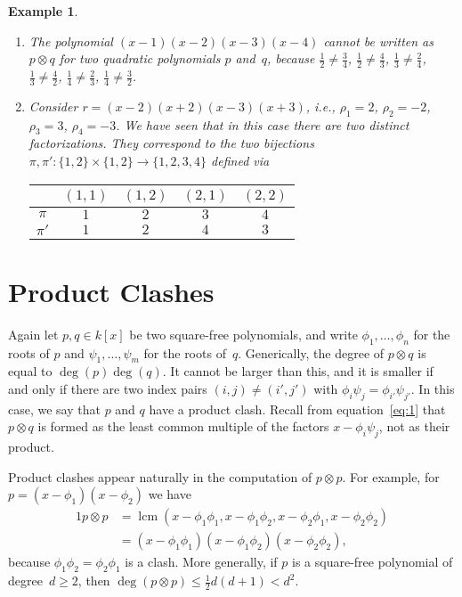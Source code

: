 \documentclass{sig-alternate}
\newtheorem{example}[theorem]{Example}
\def\lcm{\operatorname{lcm}}
\begin{document}
\begin{example}
\begin{enumerate}
    In this example, no other factorizations exist except for those that are
    obtained by replacing $p$ and $q$ by $p\otimes(x-\xi)$ and
    $(x-\xi^{-1})\otimes q$ for some $\xi\neq0$. This degree of freedom is
    reflected by the arbitrary choice of~$\phi_1$.    
  \item The polynomial $(x-1)(x-2)(x-3)(x-4)$ cannot be written as
    $p\otimes q$ for two quadratic polynomials $p$ and~$q$, because
    $\frac12\neq\frac34$,
    $\frac12\neq\frac43$,
    $\frac13\neq\frac24$,
    $\frac13\neq\frac42$,
    $\frac14\neq\frac23$,
    $\frac14\neq\frac32$.
  \item Consider $r=(x-2)(x+2)(x-3)(x+3)$, i.e., $\rho_1=2$, $\rho_2=-2$, $\rho_3=3$, $\rho_4=-3$.
    We have seen that in this case there are two distinct factorizations.
    They correspond to the two bijections
    $\pi,\pi'\colon\{1,2\}\times\{1,2\}\to\{1,2,3,4\}$ defined via
    \begin{center}
      \begin{tabular}{c|cccc}
               & $(1,1)$ & $(1,2)$ & $(2,1)$ & $(2,2)$ \\\hline
        $\pi$  &  $1$    &  $2$     &  $3$   & $4$ \\
        $\pi'$ &  $1$    &  $2$     &  $4$   & $3$
      \end{tabular}
    \end{center}
  \end{enumerate}
\end{example}

\section{Product Clashes}

Again let $p,q\in k[x]$ be two square-free polynomials, and write
$\phi_1,\dots,\phi_n$ for the roots of $p$ and $\psi_1,\dots,\psi_m$ for the
roots of~$q$. Generically, the degree of $p\otimes q$ is equal to
$\deg(p)\deg(q)$. It cannot be larger than this, and it is smaller if and only
if there are two index pairs $(i,j)\neq(i',j')$ with
$\phi_i\psi_j=\phi_{i'}\psi_{j'}$. In this case, we say that $p$ and $q$ have a
product clash. Recall from equation~\eqref{eq:1} that $p\otimes q$ is formed as
the least common multiple of the factors $x-\phi_i\psi_j$, not as their product.

Product clashes appear naturally in the computation of $p\otimes p$.
For example, for $p=(x-\phi_1)(x-\phi_2)$ we have
\begin{alignat*}1
  p\otimes p
  &=\lcm(x-\phi_1\phi_1,x-\phi_1\phi_2,x-\phi_2\phi_1,x-\phi_2\phi_2)\\
  &=(x-\phi_1\phi_1)(x-\phi_1\phi_2)(x-\phi_2\phi_2),
\end{alignat*}
because $\phi_1\phi_2=\phi_2\phi_1$ is a clash. More generally, if $p$ is a square-free
polynomial of degree~$d\geq2$, then $\deg(p\otimes p)\leq\frac12d(d+1)<d^2$.
\end{document}
